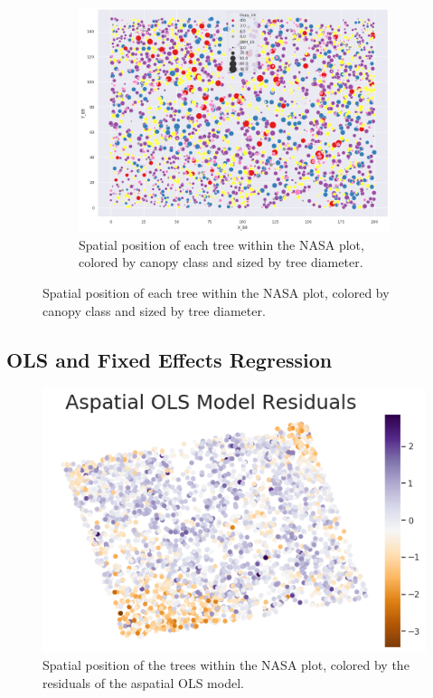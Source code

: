 \documentclass[12pt,a4paper]{article}
\begin{document}
\begin{figure}
\begin{figure}[H]
\centering
\includegraphics[scale=.75]{../figures/Eplot_TreeMap_byCnpy_byDBH.png}
\caption{Spatial position of each tree within the NASA plot, colored by canopy class and sized by tree diameter.}
\label{Eplot_TreeMap_byCnpy_byDBH} 
\end{figure}
\end{figure}








\newpage
\subsection{OLS and Fixed Effects Regression}

\begin{figure}[H]
\centering
\includegraphics[scale=.8]{../figures/OLS_mod_residuals_map.png}
\caption{Spatial position of the trees within the NASA plot, colored by the residuals of the aspatial OLS model.}
\label{OLS_mod_residuals_map} 
\end{figure}
\end{document}
